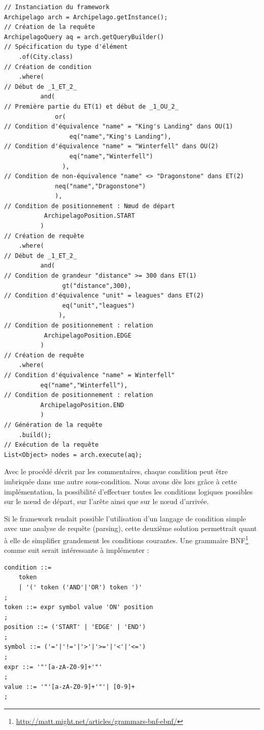 \documentclass[a4paper,fleqn,12pt,oneside]{report}
\begin{document}
\begin{lstlisting}
// Instanciation du framework
Archipelago arch = Archipelago.getInstance();
// Création de la requête
ArchipelagoQuery aq = arch.getQueryBuilder()  
// Spécification du type d'élément
    .of(City.class) 						  
// Création de condition
    .where(									  
// Début de _1_ET_2_
    	  and( 							      
// Première partie du ET(1) et début de _1_OU_2_
              or(							  
// Condition d'équivalence "name" = "King's Landing" dans OU(1)
      	          eq("name","King's Landing"),
// Condition d'équivalence "name" = "Winterfell" dans OU(2)
    	          eq("name","Winterfell")     
    	        ),
// Condition de non-équivalence "name" <> "Dragonstone" dans ET(2)
    	      neq("name","Dragonstone")       
    	      ),
// Condition de positionnement : Nœud de départ
    	   ArchipelagoPosition.START          
    	  )
// Création de requête
    .where(     
// Début de _1_ET_2_                                  
          and(        
// Condition de grandeur "distance" >= 300 dans ET(1)                                 
      	        gt("distance",300),
// Condition d'équivalence "unit" = leagues" dans ET(2)           
    	        eq("unit","leagues")          
    	       ),
// Condition de positionnement : relation
    	   ArchipelagoPosition.EDGE           
    	  )
// Création de requête
    .where(
// Condition d'équivalence "name" = Winterfell"
          eq("name","Winterfell"),
// Condition de positionnement : relation
    	  ArchipelagoPosition.END
    	  )
// Génération de la requête
    .build();
// Exécution de la requête
List<Object> nodes = arch.execute(aq);

\end{lstlisting} 
Avec le procédé décrit par les commentaires, chaque condition peut être imbriquée dans une autre sous-condition. Nous avons dès lors grâce à cette implémentation, la possibilité d'effectuer toutes les conditions logiques possibles sur le nœud de départ, sur l'arête ainsi que sur le nœud d'arrivée.

Si le framework rendait possible l'utilisation d'un langage de condition simple avec une analyse de requête (parsing), cette deuxième solution permettrait quant à elle de simplifier grandement les conditions courantes. Une grammaire BNF\footnote{\url{http://matt.might.net/articles/grammars-bnf-ebnf/}} comme suit serait intéressante à implémenter :

\begin{lstlisting}
condition ::=
	token
	| '(' token ('AND'|'OR') token ')' 
;
token ::= expr symbol value 'ON' position 
;
position ::= ('START' | 'EDGE' | 'END') 
;
symbol ::= ('='|'!='|'>'|'>='|'<'|'<=') 
;
expr ::= '"'[a-zA-Z0-9]+'"' 
;
value ::= '"'[a-zA-Z0-9]+'"'| [0-9]+ 
;
\end{lstlisting}
\end{document}
